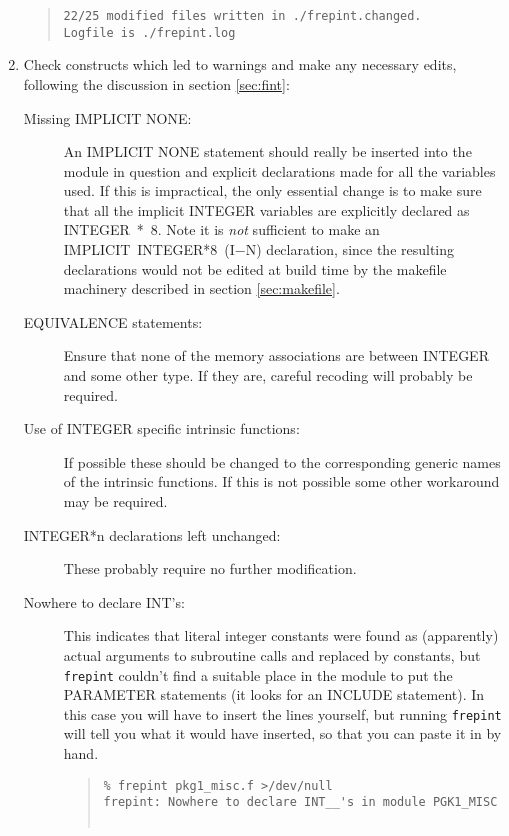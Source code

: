 \documentclass[twoside,11pt]{article}
\newcommand{\htmlref}[2]{#1}
\newcommand{\latexhtml}[2]{#1}
\renewcommand{\_}{\texttt{\symbol{95}}}
\newcommand{\xroutine}[1]{\htmlref{{\tt #1}}{#1}}
\newcommand{\routine}[1]{{\tt #1}}
\newenvironment{squote}{\begin{quote}\begin{small}}{\end{small}\end{quote}}
\begin{document}
\begin{enumerate}
\begin{squote}
\begin{verbatim}
22/25 modified files written in ./frepint.changed.
Logfile is ./frepint.log
\end{verbatim}
\end{squote}
%
\item
Check constructs which led to warnings and make any necessary edits,
following the discussion in section \ref{sec:fint}:
\begin{description}
%
\item[Missing IMPLICIT NONE:]
An IMPLICIT NONE statement should really
be inserted into the module in question and
explicit declarations made for all the variables used.
If this is impractical, the only essential change is to make sure that
all the implicit INTEGER variables are explicitly declared as INTEGER~*~8.
Note it is {\it not\/} sufficient to make an
IMPLICIT~INTEGER*8~(I\latexhtml{$-$}{-}N)
declaration, since the resulting declarations would not be edited
at build time by
the makefile machinery described in section \ref{sec:makefile}.
%
\item[EQUIVALENCE statements:]
Ensure that none of the memory associations are between INTEGER and some
other type.  If they are, careful recoding will probably be required.
%
\item[Use of INTEGER specific intrinsic functions:]
If possible these should be changed to the corresponding generic
names of the intrinsic functions.
If this is not possible some other workaround may be required.
%
\item[INTEGER*n declarations left unchanged:]
These probably require no further modification.
%
\item[Nowhere to declare INT\_\_'s:]
This indicates that literal integer constants were found as (apparently)
actual arguments to subroutine calls and replaced by constants,
but \xroutine{frepint} couldn't find a suitable place in
the module to put the PARAMETER statements (it looks for an INCLUDE
statement).  In this case you will have to insert the lines yourself,
but running \routine{frepint} will tell you what it would have inserted,
so that you can paste it in by hand.
\begin{squote}
\begin{verbatim}
% frepint pkg1_misc.f >/dev/null
frepint: Nowhere to declare INT__'s in module PGK1_MISC


\end{verbatim}
\end{squote}
\end{description}
\end{enumerate}
\end{document}
